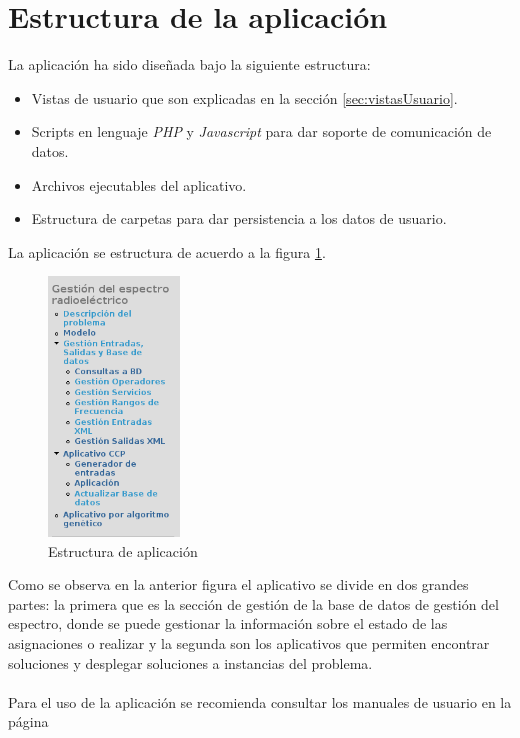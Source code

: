 	
\section{Estructura de la aplicación}

La aplicación ha sido diseñada bajo la siguiente estructura:

\begin{itemize}	
	\item Vistas de usuario que son explicadas en la sección \ref{sec:vistasUsuario}.
	\item Scripts en lenguaje \textit{PHP} y \textit{Javascript} para dar soporte de comunicación de datos.
	\item Archivos ejecutables del aplicativo.
	\item Estructura de carpetas para dar persistencia a los datos de usuario.
\end{itemize} 

La aplicación se estructura de acuerdo a la figura \ref{fig:estruApp}.

\begin{figure}[H]
	\centering
	\includegraphics[width=3.5cm]{Capitulo8InterfacesWeb/Imagenes/AplicativoCPP.png}
	\caption{Estructura de aplicación}
	\label{fig:estruApp}	
\end{figure}

Como se observa en la anterior figura el aplicativo se divide en dos grandes partes: la primera que es la sección de gestión de la base de datos de gestión del espectro, donde se puede gestionar la información sobre el estado de las asignaciones o realizar y la segunda son los aplicativos que permiten encontrar soluciones y desplegar soluciones a instancias del problema.
\\\\
Para el uso de la aplicación se recomienda consultar los manuales de usuario en la página \pageref{sec:ManualesdeUsuario}

